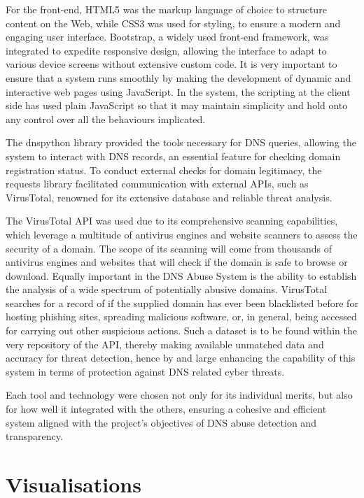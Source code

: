 For the front-end, HTML5 was the markup language of choice to structure content on the Web, while CSS3 was used for styling, to ensure a modern and engaging user interface. Bootstrap, a widely used front-end framework, was integrated to expedite responsive design, allowing the interface to adapt to various device screens without extensive custom code. It is very important to ensure that a system runs smoothly by making the development of dynamic and interactive web pages using JavaScript. In the system, the scripting at the client side has used plain JavaScript so that it may maintain simplicity and hold onto any control over all the behaviours implicated.

The dnspython library provided the tools necessary for DNS queries, allowing the system to interact with DNS records, an essential feature for checking domain registration status. To conduct external checks for domain legitimacy, the requests library facilitated communication with external APIs, such as VirusTotal, renowned for its extensive database and reliable threat analysis. 

The VirusTotal API was used due to its comprehensive scanning capabilities, which leverage a multitude of antivirus engines and website scanners to assess the security of a domain. The scope of its scanning will come from thousands of antivirus engines and websites that will check if the domain is safe to browse or download. Equally important in the DNS Abuse System is the ability to establish the analysis of a wide spectrum of potentially abusive domains. VirusTotal searches for a record of if the supplied domain has ever been blacklisted before for hosting phishing sites, spreading malicious software, or, in general, being accessed for carrying out other suspicious actions. Such a dataset is to be found within the very repository of the API, thereby making available unmatched data and accuracy for threat detection, hence by and large enhancing the capability of this system in terms of protection against DNS related cyber threats.


Each tool and technology were chosen not only for its individual merits, but also for how well it integrated with the others, ensuring a cohesive and efficient system aligned with the project's objectives of DNS abuse detection and transparency.

\section{Visualisations}

